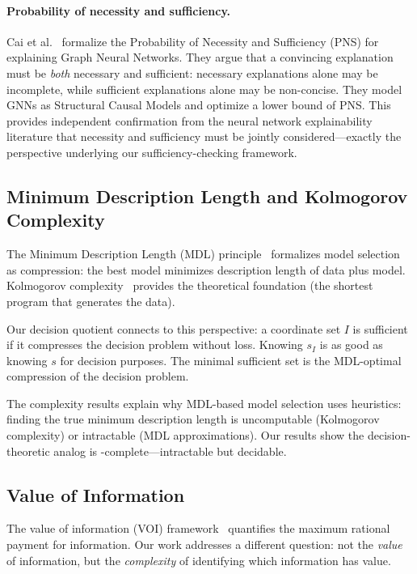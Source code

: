 \paragraph{Probability of necessity and sufficiency.} Cai et al.~\cite{cai2025pns} formalize the Probability of Necessity and Sufficiency (PNS) for explaining Graph Neural Networks. They argue that a convincing explanation must be \emph{both} necessary and sufficient: necessary explanations alone may be incomplete, while sufficient explanations alone may be non-concise. They model GNNs as Structural Causal Models and optimize a lower bound of PNS. This provides independent confirmation from the neural network explainability literature that necessity and sufficiency must be jointly considered---exactly the perspective underlying our sufficiency-checking framework.

\subsection{Minimum Description Length and Kolmogorov Complexity}

The Minimum Description Length (MDL) principle~\cite{rissanen1978modeling, grunwald2007minimum} formalizes model selection as compression: the best model minimizes description length of data plus model. Kolmogorov complexity~\cite{li2008introduction} provides the theoretical foundation (the shortest program that generates the data).

Our decision quotient connects to this perspective: a coordinate set $I$ is sufficient if it compresses the decision problem without loss. Knowing $s_I$ is as good as knowing $s$ for decision purposes. The minimal sufficient set is the MDL-optimal compression of the decision problem.

The complexity results explain why MDL-based model selection uses heuristics: finding the true minimum description length is uncomputable (Kolmogorov complexity) or intractable (MDL approximations). Our results show the decision-theoretic analog is \coNP-complete---intractable but decidable.

\subsection{Value of Information}

The value of information (VOI) framework~\cite{howard1966information} quantifies the maximum rational payment for information. Our work addresses a different question: not the \emph{value} of information, but the \emph{complexity} of identifying which information has value.

